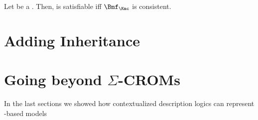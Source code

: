 \begin{theorem}
  Let \Kmc be a \SCCROM. Then, \Kmc is satisfiable iff $\Bmf_{\Kmc}$ is consistent.
\end{theorem}

\missingproof[5cm]





\clearpage

\section{Adding Inheritance}
\label{sec:adding-inheritance}





\section{Going beyond \texorpdfstring{$\Sigma$}{Sigma}-CROMs}
\label{sec:going-beyond-crom}

In the last sections we showed how contextualized description logics can represent \rosirole-based models







